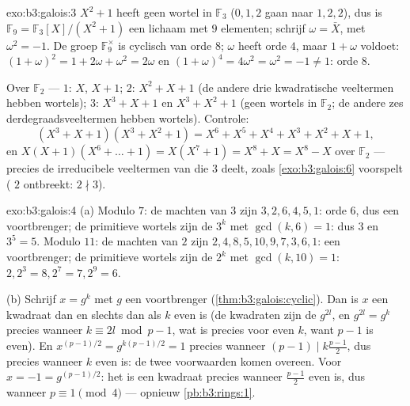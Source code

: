 \begin{solution}{exo:b3:galois:3}
$X^2 + 1$ heeft geen wortel in $\mathbb F_3$ ($0, 1, 2$ gaan naar
$1, 2, 2$), dus is $\mathbb F_9 = \mathbb F_3[X]/(X^2+1)$ een
lichaam met $9$ elementen; schrijf $\omega = \bar X$, met
$\omega^2 = -1$. De groep $\mathbb F_9^\times$ is cyclisch van
orde $8$; $\omega$ heeft orde $4$, maar $1 + \omega$ voldoet:
$(1+\omega)^2 = 1 + 2\omega + \omega^2 = 2\omega$ en $(1+\omega)^4
= 4\omega^2 = \omega^2 = -1 \ne 1$: orde $8$.

Over $\mathbb F_2$ ---  $1$: $X$, $X + 1$;  $2$: $X^2 +
X + 1$ (de andere drie kwadratische veeltermen hebben wortels);
 $3$: $X^3 + X + 1$ en $X^3 + X^2 + 1$ (geen wortels in
$\mathbb F_2$; de andere zes derdegraadsveeltermen hebben
wortels). Controle:
\[
(X^3{+}X{+}1)(X^3{+}X^2{+}1) = X^6 + X^5 + X^4 + X^3 + X^2 + X
+ 1,
\]
en $X(X{+}1)(X^6 + \dots + 1) = X(X^7 + 1) = X^8 + X = X^8 - X$
over $\mathbb F_2$ --- precies de irreducibele veeltermen van
 die $3$ deelt, zoals \cref{exo:b3:galois:6} voorspelt (
$2$ ontbreekt: $2 \nmid 3$).
\end{solution}

\begin{solution}{exo:b3:galois:4}
(a) Modulo $7$: de machten van $3$ zijn $3, 2, 6, 4, 5, 1$: orde
$6$, dus een voortbrenger; de primitieve wortels zijn de $3^k$ met
$\gcd(k, 6) = 1$: dus $3$ en $3^5 = 5$. Modulo $11$: de machten
van $2$ zijn $2, 4, 8, 5, 10, 9, 7, 3, 6, 1$: een voortbrenger; de
primitieve wortels zijn de $2^k$ met $\gcd(k, 10) = 1$: $2, 2^3 =
8, 2^7 = 7, 2^9 = 6$.

(b) Schrijf $x = g^k$ met $g$ een voortbrenger
(\cref{thm:b3:galois:cyclic}). Dan is $x$ een kwadraat dan en
slechts dan als $k$ even is (de kwadraten zijn de $g^{2l}$, en
$g^{2l} = g^{k}$ precies wanneer $k \equiv 2l \bmod p-1$, wat
 is precies voor even $k$, want $p - 1$ is even). En
$x^{(p-1)/2} = g^{k(p-1)/2} = 1$ precies wanneer $(p-1) \mid
k\frac{p-1}2$, dus precies wanneer $k$ even is: de twee
voorwaarden komen overeen. Voor $x = -1 = g^{(p-1)/2}$: het is een
kwadraat precies wanneer $\frac{p-1}2$ even is, dus wanneer $p
\equiv 1 \pmod 4$ --- opnieuw \cref{pb:b3:rings:1}.
\end{solution}

